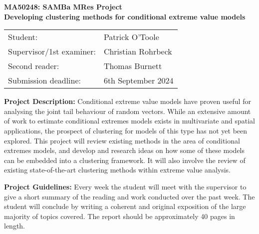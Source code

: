 \documentclass[11pt]{article}
\newcommand{\student}{Patrick O'Toole}
\newcommand{\ProjectTitle}{Developing clustering methods for conditional extreme value models}
\newcommand{\supervisor}{Christian Rohrbeck}
\newcommand{\CoD}{Thomas Burnett}
\newcommand{\deadline}{6th September 2024}
\begin{document}

\begin{center}
\bfseries{\Large MA50248: SAMBa MRes Project}\\[6pt]
\ProjectTitle
\end{center}
\begin{center}
\begin{tabular}{ll}
Student:&\student\\
Supervisor/1st examiner:&\supervisor\\
Second reader:&\CoD\\
Submission deadline:&\deadline
\end{tabular}
\end{center}



{\bf Project Description:}
Conditional extreme value models have proven useful for analysing the joint tail behaviour of random vectors. 
While an extensive amount of work to estimate conditional extremes models exists in multivariate and spatial applications, the prospect of clustering for models of this type has not yet been explored. 
This project will review existing methods in the area of conditional extremes models, and develop and research ideas on how some of these models can be embedded into a clustering framework. 
It will also involve the review of existing state-of-the-art clustering methods within extreme value analysis. 



{\bf Project Guidelines:} Every week the student will meet with the supervisor to give a short summary of the reading and work conducted over the past week.
The student will conclude by writing a coherent and original exposition of the large majority of topics covered. The report should be approximately 40 pages in length.
\end{document}
